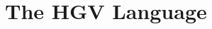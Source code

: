 \documentclass{easychair}
\newcommand{\hgv}{HGV\xspace}
\newcommand{\hgvpi}{HGV$\pi$\xspace}
\begin{document}


\section{The \hgv Language}
\end{document}
